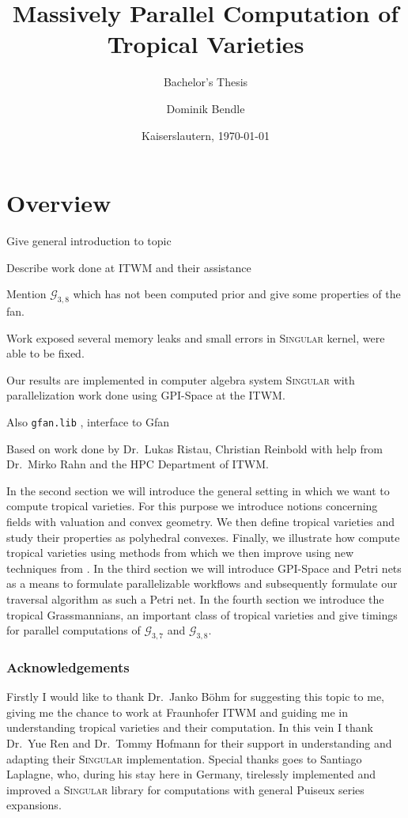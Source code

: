\documentclass[
  paper=a4,
  titlepage,
  bibliography=totoc,
  listof=totoc,
  pagesize=pdftex
]{scrartcl}
\subtitle{Bachelor's Thesis}
\title{Massively Parallel Computation of Tropical Varieties}
\author{Dominik Bendle}
\date{Kaiserslautern, \today}
\numberwithin{figure}{section}
\numberwithin{equation}{section}
\numberwithin{table}{section}
\theoremstyle{definition}
\numberwithin{definition}{section}
\begin{document}
\pagestyle{headings}

\maketitle

\tableofcontents
\newpage

\section{Overview}

Give general introduction to topic

Describe work done at ITWM and their assistance

Mention $\mathcal G_{3,8}$ which has not been computed prior and give some properties of the
fan.

Work exposed several memory leaks and small errors in \textsc{Singular} kernel, were able
to be fixed.

Our results are implemented in computer algebra system \textsc{Singular} \cite{Singular}
with parallelization work done using GPI-Space at the ITWM.

Also \texttt{gfan.lib} \cite{gfanLib}, interface to Gfan \cite{gfan} %

Based on work done by Dr.\ Lukas Ristau, Christian Reinbold with help from Dr.\ Mirko Rahn
and the HPC Department of ITWM.



In the second section we will introduce the general setting in which we want to compute
tropical varieties. For this purpose we introduce notions concerning fields with valuation
and convex geometry. We then define tropical varieties and study their properties as
polyhedral convexes. Finally, we illustrate how compute tropical varieties using methods
from \cite{compTropVar} which we then improve using new techniques from
\cite{tropPointsLinks}. In the third section we will introduce GPI-Space and Petri nets as
a means to formulate parallelizable workflows and subsequently formulate our traversal
algorithm as such a Petri net. In the fourth section we introduce the tropical
Grassmannians, an important class of tropical varieties and give timings for parallel
computations of $\mathcal G_{3,7}$ and $\mathcal G_{3,8}$.

\subsubsection*{Acknowledgements}
Firstly I would like to thank Dr.~Janko Böhm for suggesting this topic to me, giving me
the chance to work at Fraunhofer ITWM and guiding me in understanding tropical varieties
and their computation. In this vein I thank Dr.~Yue Ren and Dr.~Tommy Hofmann for their
support in understanding and adapting their \textsc{Singular} implementation. Special
thanks goes to Santiago Laplagne, who, during his stay here in Germany, tirelessly
implemented and improved a \textsc{Singular} library for computations with general Puiseux
series expansions.
\end{document}
